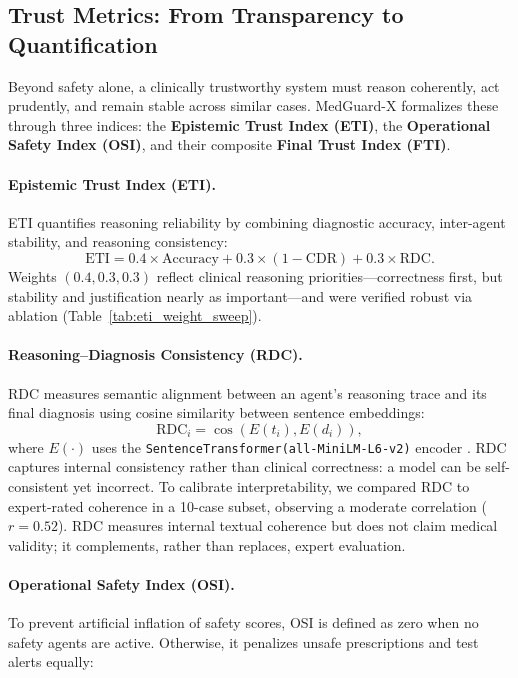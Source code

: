 \documentclass[letterpaper]{article} %
\begin{document}
\subsection{Trust Metrics: From Transparency to Quantification}

Beyond safety alone, a clinically trustworthy system must reason coherently, act prudently, and remain stable across similar cases. 
MedGuard-X formalizes these through three indices: the \textbf{Epistemic Trust Index (ETI)}, the \textbf{Operational Safety Index (OSI)}, and their composite \textbf{Final Trust Index (FTI)}.

\paragraph{Epistemic Trust Index (ETI).}
ETI quantifies reasoning reliability by combining diagnostic accuracy, inter-agent stability, and reasoning consistency:
\[
\mathrm{ETI} = 0.4 \times \mathrm{Accuracy} + 0.3 \times (1 - \mathrm{CDR}) + 0.3 \times \mathrm{RDC}.
\]
Weights $(0.4, 0.3, 0.3)$ reflect clinical reasoning priorities—correctness first, but stability and justification nearly as important—and were verified robust via ablation (Table~\ref{tab:eti_weight_sweep}). 

\paragraph{Reasoning–Diagnosis Consistency (RDC).}
RDC measures semantic alignment between an agent’s reasoning trace and its final diagnosis using cosine similarity between sentence embeddings:
\[
\mathrm{RDC}_i = \cos(E(t_i), E(d_i)),
\]
where $E(\cdot)$ uses the \texttt{SentenceTransformer(all-MiniLM-L6-v2)} encoder \cite{reimers2019sentencebert}.  
RDC captures internal consistency rather than clinical correctness: a model can be self-consistent yet incorrect. 
To calibrate interpretability, we compared RDC to expert-rated coherence in a 10-case subset, observing a moderate correlation ($r{=}0.52$). RDC measures internal textual coherence but does not claim medical validity; it complements, rather than replaces, expert evaluation.

\paragraph{Operational Safety Index (OSI).}
To prevent artificial inflation of safety scores, OSI is defined as zero when no safety agents are active.
Otherwise, it penalizes unsafe prescriptions and test alerts equally:
\end{document}
